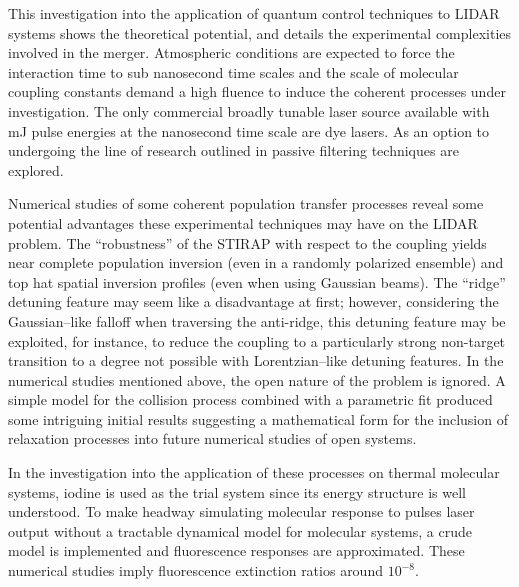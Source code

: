 This investigation into the application of quantum control techniques to LIDAR systems shows the theoretical potential, and details the experimental complexities involved in the merger. Atmospheric conditions are expected to force the interaction time to sub nanosecond time scales and the scale of molecular coupling constants demand a high fluence to induce the coherent processes under investigation. The only commercial broadly tunable laser source available with mJ pulse energies at the nanosecond time scale are dye lasers. As an option to undergoing the line of research outlined in \cite{Corless:1997a} passive filtering techniques are explored. 

Numerical studies of some coherent population transfer processes reveal some potential advantages these experimental techniques may have on the LIDAR problem. The ``robustness'' of the STIRAP with respect to the coupling yields near complete population inversion (even in a randomly polarized ensemble) and top hat spatial inversion profiles (even when using Gaussian beams). The ``ridge'' detuning feature may seem like a disadvantage at first; however, considering the Gaussian--like falloff when traversing the anti-ridge, this detuning feature may be exploited, for instance, to reduce the coupling to a particularly strong non-target transition to a degree not possible with Lorentzian--like detuning features. In the numerical studies mentioned above, the open nature of the problem is ignored. A simple model for the collision process combined with a parametric fit produced some intriguing initial results suggesting a mathematical form for the inclusion of relaxation processes into future numerical studies of open systems. 

In the investigation into the application of these processes on thermal molecular systems, iodine is used as the trial system since its energy structure is well understood. To make headway simulating molecular response to pulses laser output without a tractable dynamical model for molecular systems, a crude model is implemented and fluorescence responses are approximated. These numerical studies imply fluorescence extinction ratios around $10^{-8}$.

